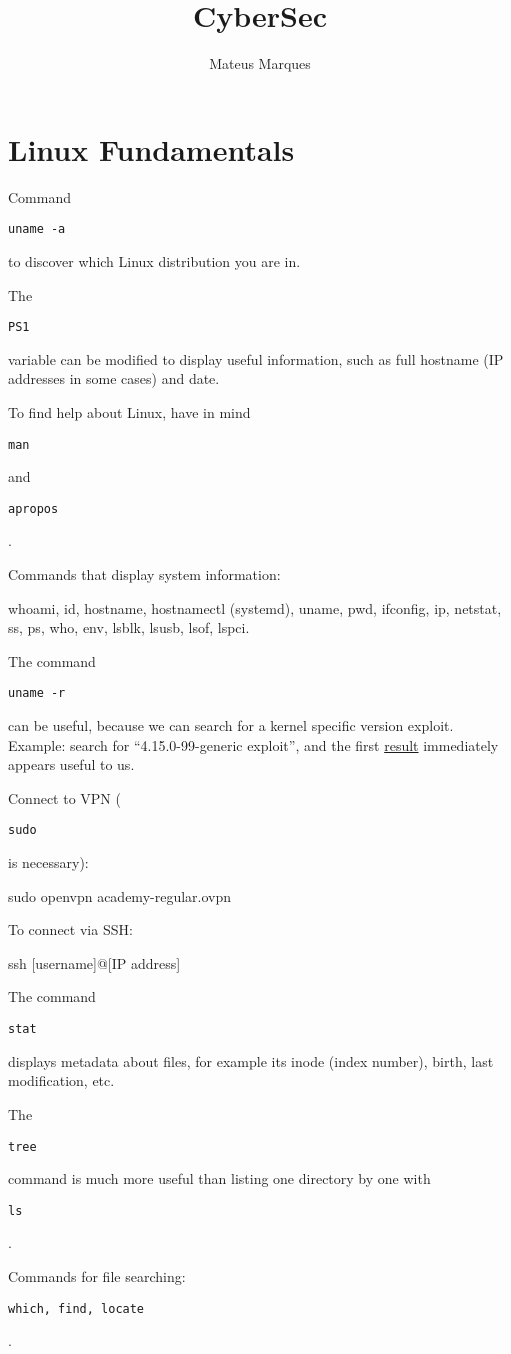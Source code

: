 \documentclass[a4paper,12pt]{article}
\title{\Huge{\textbf{CyberSec}}}
\author{Mateus Marques}
\newcommand{\bashinline}[1]{%
\colorbox{bashcodebg}{%
\parbox[b][0.6em]{\widthof{\texttt{#1}}}{\texttt{#1}}%
}%
}
\begin{document}
\maketitle

\section{Linux Fundamentals}

Command \bashinline{uname -a} to discover which Linux distribution you are in.

\n

The \bashinline{PS1} variable can be modified to display useful information, such as full hostname (IP addresses in some cases) and date.

\n

To find help about Linux, have in mind \bashinline{man} and \bashinline{apropos}.

\n

Commands that display system information:
\begin{bash}
whoami, id, hostname, hostnamectl (systemd), uname, pwd, ifconfig,
ip, netstat, ss, ps, who, env, lsblk, lsusb, lsof, lspci.
\end{bash}

The command \bashinline{uname -r} can be useful, because we can search for a kernel specific version exploit. Example: search for ``4.15.0-99-generic exploit'', and the first \href{https://www.exploit-db.com/exploits/47163}{result} immediately appears useful to us.

\n

Connect to VPN (\bashinline{sudo} is necessary):
\begin{bash}
sudo openvpn academy-regular.ovpn
\end{bash}

To connect via SSH:
\begin{bash}
ssh [username]@[IP address]
\end{bash}

The command \bashinline{stat} displays metadata about files, for example its inode (index number), birth, last modification, etc.

\n

The \bashinline{tree} command is much more useful than listing one directory by one with \bashinline{ls}.

\n

Commands for file searching: \bashinline{which, find, locate}.

\n
\end{document}
